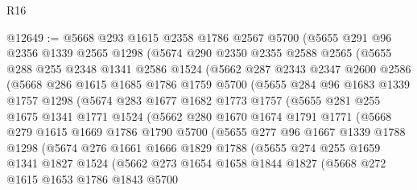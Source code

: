 \begin{lexlean}{R16}
\begin{coremodule}
@12649 := @5668
    @293
    @1615
    @2358
    @1786
    @2567
    @5700
    (@5655
      @291
      @96
      @2356
      @1339
      @2565
      @1298
      (@5674
        @290
        @2350
        @2355
        @2588
        @2565
        (@5655
          @288
          @255
          @2348
          @1341
          @2586
          @1524
          (@5662
            @287
            @2343
            @2347
            @2600
            @2586
            (@5668
              @286
              @1615
              @1685
              @1786
              @1759
              @5700
              (@5655
                @284
                @96
                @1683
                @1339
                @1757
                @1298
                (@5674
                  @283
                  @1677
                  @1682
                  @1773
                  @1757
                  (@5655
                    @281
                    @255
                    @1675
                    @1341
                    @1771
                    @1524
                    (@5662
                      @280
                      @1670
                      @1674
                      @1791
                      @1771
                      (@5668
                        @279
                        @1615
                        @1669
                        @1786
                        @1790
                        @5700
                        (@5655
                          @277
                          @96
                          @1667
                          @1339
                          @1788
                          @1298
                          (@5674
                            @276
                            @1661
                            @1666
                            @1829
                            @1788
                            (@5655
                              @274
                              @255
                              @1659
                              @1341
                              @1827
                              @1524
                              (@5662
                                @273
                                @1654
                                @1658
                                @1844
                                @1827
                                (@5668
                                  @272
                                  @1615
                                  @1653
                                  @1786
                                  @1843
                                  @5700

\end{coremodule}
\end{lexlean}
